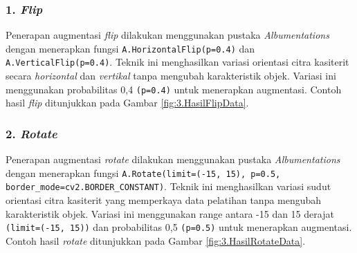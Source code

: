 \subsubsection*{\textnormal{1. \textit{Flip}}}
Penerapan augmentasi \textit{flip} dilakukan menggunakan pustaka \textit{Albumentations} dengan menerapkan fungsi \texttt{A.HorizontalFlip(p=0.4)} dan \texttt{A.VerticalFlip(p=0.4)}. Teknik ini menghasilkan variasi orientasi citra kasiterit secara \textit{horizontal} dan \textit{vertikal} tanpa mengubah karakteristik objek. Variasi ini menggunakan probabilitas 0{,}4 \texttt{(p=0.4)}  untuk menerapkan augmentasi. Contoh hasil \textit{flip} ditunjukkan pada Gambar \ref{fig:3.HasilFlipData}. \par

    


\subsubsection*{\textnormal{2. \textit{Rotate}}}
Penerapan augmentasi \textit{rotate} dilakukan menggunakan pustaka \textit{Albumentations} dengan menerapkan fungsi \texttt{A.Rotate(limit=(-15, 15), p=0.5, border\_mode=cv2.BORDER\_CONSTANT)}. Teknik ini menghasilkan variasi sudut orientasi citra kasiterit yang memperkaya data pelatihan tanpa mengubah karakteristik objek. Variasi ini menggunakan range antara -15 dan 15 derajat \texttt{(limit=(-15, 15))} dan probabilitas 0{,}5 \texttt{(p=0.5)} untuk menerapkan augmentasi. Contoh hasil \textit{rotate} ditunjukkan pada Gambar \ref{fig:3.HasilRotateData}. \par

